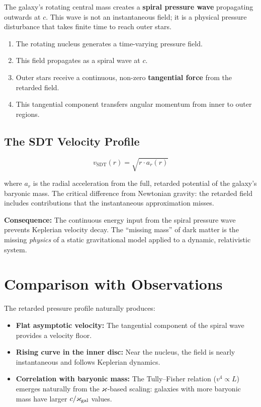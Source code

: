 The galaxy's rotating central mass creates a \textbf{spiral pressure wave} propagating outwards at $c$.  This wave is not an instantaneous field; it is a physical pressure disturbance that takes finite time to reach outer stars.

\begin{enumerate}
  \item The rotating nucleus generates a time-varying pressure field.
  \item This field propagates as a spiral wave at $c$.
  \item Outer stars receive a continuous, non-zero \textbf{tangential force} from the retarded field.
  \item This tangential component transfers angular momentum from inner to outer regions.
\end{enumerate}

\subsection{The SDT Velocity Profile}

\begin{equation}\label{eq:v-galaxy}
  v_{\text{SDT}}(r) = \sqrt{r \cdot a_r(r)}
\end{equation}

where $a_r$ is the radial acceleration from the full, retarded potential of the galaxy's baryonic mass.  The critical difference from Newtonian gravity: the retarded field includes contributions that the instantaneous approximation misses.

\textbf{Consequence:} The continuous energy input from the spiral pressure wave prevents Keplerian velocity decay.  The ``missing mass'' of dark matter is the missing \emph{physics} of a static gravitational model applied to a dynamic, relativistic system.


\section{Comparison with Observations}
\label{sec:rotation-comparison}

The retarded pressure profile naturally produces:
\begin{itemize}
  \item \textbf{Flat asymptotic velocity:} The tangential component of the spiral wave provides a velocity floor.
  \item \textbf{Rising curve in the inner disc:} Near the nucleus, the field is nearly instantaneous and follows Keplerian dynamics.
  \item \textbf{Correlation with baryonic mass:} The Tully--Fisher relation ($v^4 \propto L$) emerges naturally from the $\varkappa$-based scaling: galaxies with more baryonic mass have larger $c/\varkappa_{\text{gal}}$ values.
\end{itemize}

